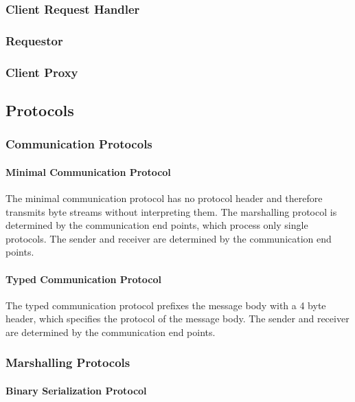 \subsubsection{Client Request Handler}

\subsubsection{Requestor}

\subsubsection{Client Proxy}

\subsection{Protocols}

\subsubsection{Communication Protocols}

\paragraph{Minimal Communication Protocol}

The minimal communication protocol has no protocol header and therefore transmits byte streams without interpreting them.
The marshalling protocol is determined by the communication end points, which process only single protocols.
The sender and receiver are determined by the communication end points.

\paragraph{Typed Communication Protocol}

The typed communication protocol prefixes the message body with a 4 byte header, which specifies the protocol of the message body.
The sender and receiver are determined by the communication end points.

\subsubsection{Marshalling Protocols}

\paragraph{Binary Serialization Protocol}

